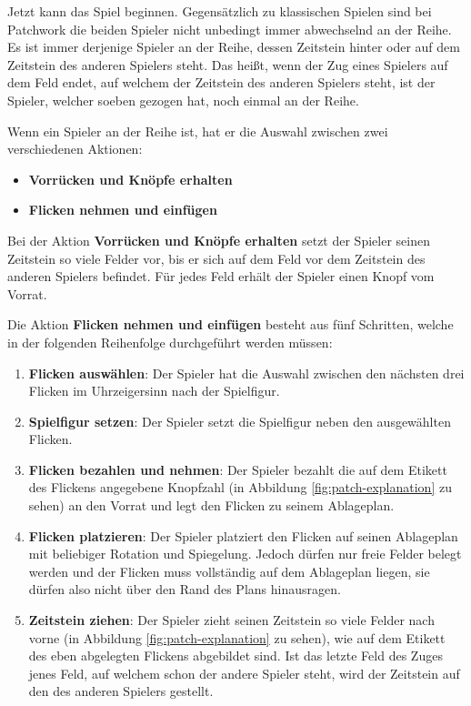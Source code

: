 Jetzt kann das Spiel beginnen. Gegensätzlich zu klassischen Spielen sind bei Patchwork die beiden Spieler nicht unbedingt immer abwechselnd an der Reihe. Es ist immer derjenige Spieler an der Reihe, dessen Zeitstein hinter oder auf dem Zeitstein des anderen Spielers steht. Das heißt, wenn der Zug eines Spielers auf dem Feld endet, auf welchem der Zeitstein des anderen Spielers steht, ist der Spieler, welcher soeben gezogen hat, noch einmal an der Reihe. \cite{2014.PatchworkSpielanleitung}

Wenn ein Spieler an der Reihe ist, hat er die Auswahl zwischen zwei verschiedenen Aktionen:

\begin{itemize}
    \item \textbf{Vorrücken und Knöpfe erhalten} \cite{2014.PatchworkSpielanleitung}
    \item \textbf{Flicken nehmen und einfügen} \cite{2014.PatchworkSpielanleitung}
\end{itemize}

Bei der Aktion \textbf{Vorrücken und Knöpfe erhalten} setzt der Spieler seinen Zeitstein so viele Felder vor, bis er sich auf dem Feld vor dem Zeitstein des anderen Spielers befindet. Für jedes Feld erhält der Spieler einen Knopf vom Vorrat. \cite{2014.PatchworkSpielanleitung}

Die Aktion \textbf{Flicken nehmen und einfügen} besteht aus fünf Schritten, welche in der folgenden Reihenfolge durchgeführt werden müssen:

\begin{enumerate}
    \item \textbf{Flicken auswählen}: Der Spieler hat die Auswahl zwischen den nächsten drei Flicken im Uhrzeigersinn nach der Spielfigur. \cite{2014.PatchworkSpielanleitung}
    \item \textbf{Spielfigur setzen}: Der Spieler setzt die Spielfigur neben den ausgewählten Flicken. \cite{2014.PatchworkSpielanleitung}
    \item \textbf{Flicken bezahlen und nehmen}: Der Spieler bezahlt die auf dem Etikett des Flickens angegebene Knopfzahl (in Abbildung \ref{fig:patch-explanation} zu sehen) an den Vorrat und legt den Flicken zu seinem Ablageplan. \cite{2014.PatchworkSpielanleitung}
    \item \textbf{Flicken platzieren}: Der Spieler platziert den Flicken auf seinen Ablageplan mit beliebiger Rotation und Spiegelung. Jedoch dürfen nur freie Felder belegt werden und der Flicken muss vollständig auf dem Ablageplan liegen, sie dürfen also nicht über den Rand des Plans hinausragen. \cite{2014.PatchworkSpielanleitung}
    \item \textbf{Zeitstein ziehen}: Der Spieler zieht seinen Zeitstein so viele Felder nach vorne (in Abbildung \ref{fig:patch-explanation} zu sehen), wie auf dem Etikett des eben abgelegten Flickens abgebildet sind. Ist das letzte Feld des Zuges jenes Feld, auf welchem schon der andere Spieler steht, wird der Zeitstein auf den des anderen Spielers gestellt. \cite{2014.PatchworkSpielanleitung}
\end{enumerate}

